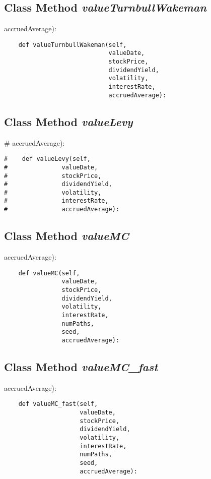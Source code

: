 \documentclass[twoside,11pt]{book}
\begin{document}
\subsection{Class Method {\it valueTurnbullWakeman}}
accruedAverage):

\begin{lstlisting}
    def valueTurnbullWakeman(self,
                             valueDate,
                             stockPrice,
                             dividendYield,
                             volatility,
                             interestRate,
                             accruedAverage):
\end{lstlisting}

\subsection{Class Method {\it valueLevy}}
\#               accruedAverage):

\begin{lstlisting}
#    def valueLevy(self,
#               valueDate,
#               stockPrice,
#               dividendYield,
#               volatility,
#               interestRate,
#               accruedAverage):
\end{lstlisting}

\subsection{Class Method {\it valueMC}}
accruedAverage):

\begin{lstlisting}
    def valueMC(self,
                valueDate,
                stockPrice,
                dividendYield,
                volatility,
                interestRate,
                numPaths,
                seed,
                accruedAverage):
\end{lstlisting}

\subsection{Class Method {\it valueMC\_fast}}
accruedAverage):

\begin{lstlisting}
    def valueMC_fast(self,
                     valueDate,
                     stockPrice,
                     dividendYield,
                     volatility,
                     interestRate,
                     numPaths,
                     seed,
                     accruedAverage):
\end{lstlisting}
\end{document}
